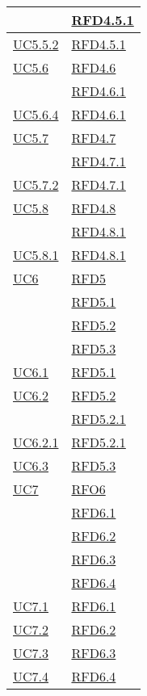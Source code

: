\begin{longtable}{|>{\centering}m{5cm}|m{5cm}<{\centering}|}
& \hyperlink{RFD4.5.1}{RFD4.5.1}\\ \hline
\hyperref[UC5.5.2]{UC5.5.2} & \hyperlink{RFD4.5.1}{RFD4.5.1}\\ \hline
\hyperref[UC5.6]{UC5.6} & \hyperlink{RFD4.6}{RFD4.6}\\
& \hyperlink{RFD4.6.1}{RFD4.6.1}\\ \hline
\hyperref[UC5.6.4]{UC5.6.4} & \hyperlink{RFD4.6.1}{RFD4.6.1}\\ \hline
\hyperref[UC5.7]{UC5.7} & \hyperlink{RFD4.7}{RFD4.7}\\
& \hyperlink{RFD4.7.1}{RFD4.7.1}\\ \hline
\hyperref[UC5.7.2]{UC5.7.2} & \hyperlink{RFD4.7.1}{RFD4.7.1}\\ \hline
\hyperref[UC5.8]{UC5.8} & \hyperlink{RFD4.8}{RFD4.8}\\
& \hyperlink{RFD4.8.1}{RFD4.8.1}\\ \hline
\hyperref[UC5.8.1]{UC5.8.1} & \hyperlink{RFD4.8.1}{RFD4.8.1}\\ \hline
\hyperref[UC6]{UC6} & \hyperlink{RFD5}{RFD5}\\
& \hyperlink{RFD5.1}{RFD5.1}\\
& \hyperlink{RFD5.2}{RFD5.2}\\
& \hyperlink{RFD5.3}{RFD5.3}\\ \hline
\hyperref[UC6.1]{UC6.1} & \hyperlink{RFD5.1}{RFD5.1}\\ \hline
\hyperref[UC6.2]{UC6.2} & \hyperlink{RFD5.2}{RFD5.2}\\
& \hyperlink{RFD5.2.1}{RFD5.2.1}\\ \hline
\hyperref[UC6.2.1]{UC6.2.1} & \hyperlink{RFD5.2.1}{RFD5.2.1}\\ \hline
\hyperref[UC6.3]{UC6.3} & \hyperlink{RFD5.3}{RFD5.3}\\ \hline
\hyperref[UC7]{UC7} & \hyperlink{RFO6}{RFO6}\\
& \hyperlink{RFD6.1}{RFD6.1}\\
& \hyperlink{RFD6.2}{RFD6.2}\\
& \hyperlink{RFD6.3}{RFD6.3}\\
& \hyperlink{RFD6.4}{RFD6.4}\\ \hline
\hyperref[UC7.1]{UC7.1} & \hyperlink{RFD6.1}{RFD6.1}\\ \hline
\hyperref[UC7.2]{UC7.2} & \hyperlink{RFD6.2}{RFD6.2}\\ \hline
\hyperref[UC7.3]{UC7.3} & \hyperlink{RFD6.3}{RFD6.3}\\ \hline
\hyperref[UC7.4]{UC7.4} & \hyperlink{RFD6.4}{RFD6.4}\\ \hline

\end{longtable}
